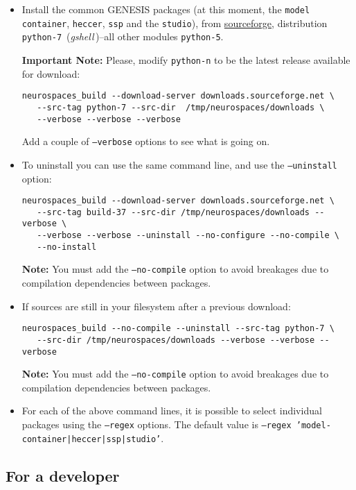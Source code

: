 \documentclass[12pt]{article}
\begin{document}
\begin{itemize}
\item Install the common GENESIS packages (at this moment, the {\tt model container}, {\tt heccer}, {\tt ssp} and the {\tt studio}), from  \href{http://sourceforge.net/project/showfiles.php?group_id=162899}{sourceforge}, distribution {\tt python-7}\,\,\,({\it gshell\,})--all other modules {\tt python-5}.

{\bf Important Note:} Please, modify {\tt python-n} to be the latest release available for download:
\begin{verbatim}
neurospaces_build --download-server downloads.sourceforge.net \
   --src-tag python-7 --src-dir  /tmp/neurospaces/downloads \
   --verbose --verbose --verbose
\end{verbatim}
Add a couple of {\tt --verbose} options to see what is going on. 

\item To uninstall you can use the same command line, and use the {\tt --uninstall} option:
\begin{verbatim}
neurospaces_build --download-server downloads.sourceforge.net \
   --src-tag build-37 --src-dir /tmp/neurospaces/downloads --verbose \
   --verbose --verbose --uninstall --no-configure --no-compile \
   --no-install
\end{verbatim}
{\bf Note:} You must add the {\tt --no-compile} option to avoid breakages due to compilation dependencies between packages. 

\item If sources are still in your filesystem after a previous download:
\begin{verbatim}
neurospaces_build --no-compile --uninstall --src-tag python-7 \
   --src-dir /tmp/neurospaces/downloads --verbose --verbose --verbose
\end{verbatim}
{\bf Note:} You must add the {\tt --no-compile} option to avoid breakages due to compilation dependencies between packages. 

\item For each of the above command lines, it is possible to select individual packages using the {\tt --regex} options. The default value is {\tt --regex 'model-container|heccer|ssp|studio'}. 

\end{itemize}

\subsection*{For a developer}
\end{document}
